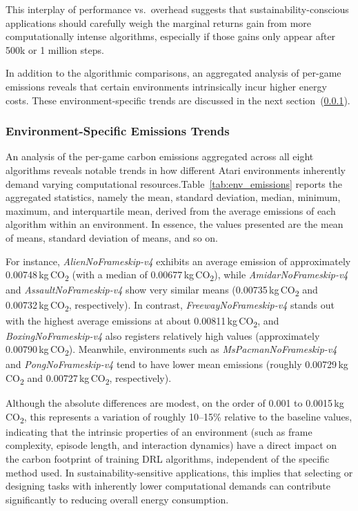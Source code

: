 This interplay of performance vs.\ overhead suggests that sustainability-conscious 
applications should carefully weigh the marginal returns gain from more computationally 
intense algorithms, especially if those gains only appear after 500k or 1 million steps.

In addition to the algorithmic comparisons, an aggregated analysis of per-game emissions reveals that certain environments intrinsically incur higher energy costs. These environment-specific trends are discussed in the next section~(\ref{subsubsec:environment_emissions}).

\subsubsection{Environment-Specific Emissions Trends}
\label{subsubsec:environment_emissions}
An analysis of the per-game carbon emissions aggregated across all eight algorithms reveals notable trends in how different Atari environments inherently demand varying computational resources.Table~\ref{tab:env_emissions} reports the aggregated statistics, namely the mean, standard deviation, median, minimum, maximum, and interquartile mean, derived from the average emissions of each algorithm within an environment. In essence, the values presented are the mean of means, standard deviation of means, and so on.

For instance, \emph{AlienNoFrameskip-v4} exhibits an average emission of approximately \num{0.00748}\,kg\,CO\textsubscript{2} (with a median of \num{0.00677}\,kg\,CO\textsubscript{2}), while \emph{AmidarNoFrameskip-v4} and \emph{AssaultNoFrameskip-v4} show very similar means (\num{0.00735}\,kg\,CO\textsubscript{2} and \num{0.00732}\,kg\,CO\textsubscript{2}, respectively). In contrast, \emph{FreewayNoFrameskip-v4} stands out with the highest average emissions at about \num{0.00811}\,kg\,CO\textsubscript{2}, and \emph{BoxingNoFrameskip-v4} also registers relatively high values (approximately \num{0.00790}\,kg\,CO\textsubscript{2}). Meanwhile, environments such as \emph{MsPacmanNoFrameskip-v4} and \emph{PongNoFrameskip-v4} tend to have lower mean emissions (roughly \num{0.00729}\,kg\,CO\textsubscript{2} and \num{0.00727}\,kg\,CO\textsubscript{2}, respectively).

Although the absolute differences are modest, on the order of \num{0.001} to \num{0.0015}\,kg\,CO\textsubscript{2}, this represents a variation of roughly \num{10}–\num{15}\% relative to the baseline values, indicating that the intrinsic properties of an environment (such as frame complexity, episode length, and interaction dynamics) have a direct impact on the carbon footprint of training DRL algorithms, independent of the specific method used. In sustainability-sensitive applications, this implies that selecting or designing tasks with inherently lower computational demands can contribute significantly to reducing overall energy consumption.

